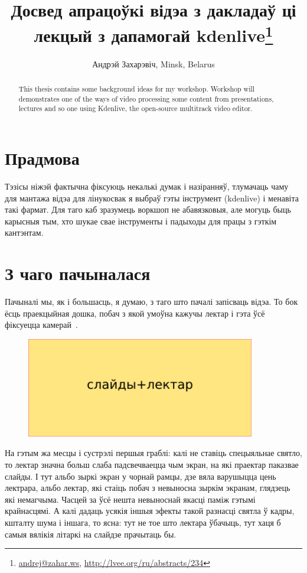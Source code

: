 \documentclass[10pt, a5paper]{article}
\begin{document}
\title{Досвед апрацоўкі відэа з дакладаў ці лекцый з дапамогай kdenlive\footnote{\url{andrej@zahar.ws}, \url{http://lvee.org/ru/abstracts/234}}}
\author{Андрэй Захарэвіч, Minsk, Belarus}
\maketitle
\begin{abstract}
This thesis contains some background ideas for my workshop. Workshop will demonstrates one of the ways of video processing some content from presentations, lectures and so one using \linebreak Kdenlive, the open-source multitrack video editor.
\end{abstract}
\section*{Прадмова}

Тэзісы ніжэй фактычна фіксуюць некалькі думак і назіранняў, тлумачаць чаму для мантажа відэа для лінукосвак я выбраў гэты інструмент (kdenlive) і менавіта такі фармат. Для таго каб зразумець воркшоп не абавязковыя, але могуць быць карысныя тым, хто шукае свае інструменты і падыходы для працы з гэткім кантэнтам.

\section*{З чаго пачыналася}

Пачыналі мы, як і большасць, я думаю, з таго што пачалі запісваць відэа. То бок ёсць праекцыйная дошка, побач з якой умоўна кажучы лектар і гэта ўсё фіксуецца камерай~\cite{Zakharevich1}.


\begin{figure}[h!]
  \centering
  \includegraphics[width=10cm]{32_2016_Zakharevich1.png}
\end{figure}

На гэтым жа месцы і сустрэлі першыя граблі: калі не ставіць спецыяльнае святло, то лектар значна больш слаба падсвечваецца чым экран, на які праектар паказвае слайды. І тут альбо зыркі экран у чорнай рамцы, дзе вяла варушыцца цень лектрара, альбо лектар, які стаіць побач з невыносна зыркім экранам, глядзець які немагчыма. Часцей за ўсё нешта невыноснай якасці паміж гэтымі крайнасцямі. А калі дадаць усякія іншыя эфекты такой разнасці святла ў кадры, кшталту шума і іншага, то ясна: тут не тое што лектара ўбачыць, тут хаця б самыя вялікія літаркі на слайдзе прачытаць бы.
\end{document}
